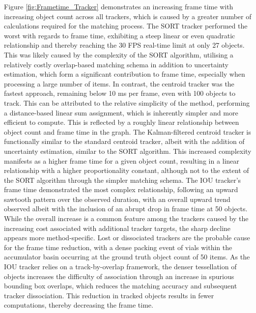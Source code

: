 \documentclass[10pt]{article}
\begin{document}
Figure \ref{fig:Frametime_Tracker} demonstrates an increasing frame time with increasing object count across all trackers, which is caused by a greater number of calculations required for the matching process. 
The SORT tracker performed the worst with regards to frame time, exhibiting a steep linear or even quadratic relationship and thereby reaching the 30 FPS real-time limit at only 27 objects. This was likely caused by the complexity of the SORT algorithm, utilising a relatively costly overlap-based matching schema in addition to uncertainty estimation, which form a significant contribution to frame time, especially when processing a large number of items.
In contrast, the centroid tracker was the fastest approach, remaining below 10 ms per frame, even with 100 objects to track. This can be attributed to the relative simplicity of the method, performing a distance-based linear sum assignment, which is inherently simpler and more efficient to compute. This is reflected by a roughly linear relationship between object count and frame time in the graph.
The Kalman-filtered centroid tracker is functionally similar to the standard centroid tracker, albeit with the addition of uncertainty estimation, similar to the SORT algorithm. This increased complexity manifests as a higher frame time for a given object count, resulting in a linear relationship with a higher proportionality constant, although not to the extent of the SORT algorithm through the simpler matching schema.
The IOU tracker's frame time demonstrated the most complex relationship, following an upward sawtooth pattern over the observed duration, with an overall upward trend observed albeit with the inclusion of an abrupt drop in frame time at 50 objects. While the overall increase is a common feature among the trackers caused by the increasing cost associated with additional tracker targets, the sharp decline appears more method-specific. Lost or dissociated trackers are the probable cause for the frame time reduction, with a dense packing event of vials within the accumulator basin occurring at the ground truth object count of 50 items. As the IOU tracker relies on a track-by-overlap framework, the denser tessellation of objects increases the difficulty of association through an increase in spurious bounding box overlaps, which reduces the matching accuracy and subsequent tracker dissociation. This reduction in tracked objects results in fewer computations, thereby decreasing the frame time.
\end{document}
